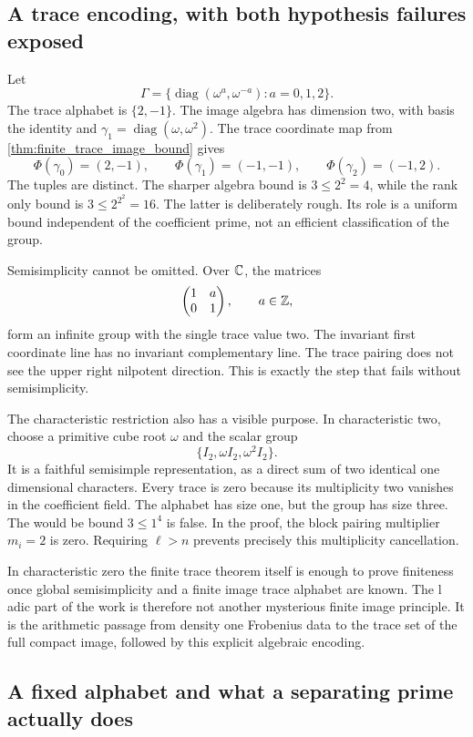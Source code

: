 \subsection{A trace encoding, with both hypothesis failures exposed}

Let
\[
 \Gamma=\{\operatorname{diag}(\omega^a,\omega^{-a}):a=0,1,2\}.
\]
The trace alphabet is \(\{2,-1\}\). The image algebra has dimension two, with basis the identity and \(\gamma_1=\operatorname{diag}(\omega,\omega^2)\). The trace coordinate map from \cref{thm:finite_trace_image_bound} gives
\[
 \Phi(\gamma_0)=(2,-1),\qquad
 \Phi(\gamma_1)=(-1,-1),\qquad
 \Phi(\gamma_2)=(-1,2).
\]
The tuples are distinct. The sharper algebra bound is \(3\le2^2=4\), while the rank only bound is \(3\le2^{2^2}=16\). The latter is deliberately rough. Its role is a uniform bound independent of the coefficient prime, not an efficient classification of the group.

Semisimplicity cannot be omitted. Over \(\mathbb C\), the matrices
\[
 \begin{pmatrix}1&a\\0&1\end{pmatrix},\qquad a\in\mathbb Z,
\]
form an infinite group with the single trace value two. The invariant first coordinate line has no invariant complementary line. The trace pairing does not see the upper right nilpotent direction. This is exactly the step that fails without semisimplicity.

The characteristic restriction also has a visible purpose. In characteristic two, choose a primitive cube root \(\omega\) and the scalar group
\[
 \{I_2,\omega I_2,\omega^2 I_2\}.
\]
It is a faithful semisimple representation, as a direct sum of two identical one dimensional characters. Every trace is zero because its multiplicity two vanishes in the coefficient field. The alphabet has size one, but the group has size three. The would be bound \(3\le1^{4}\) is false. In the proof, the block pairing multiplier \(m_i=2\) is zero. Requiring \(\ell>n\) prevents precisely this multiplicity cancellation.

In characteristic zero the finite trace theorem itself is enough to prove finiteness once global semisimplicity and a finite image trace alphabet are known. The l adic part of the work is therefore not another mysterious finite image principle. It is the arithmetic passage from density one Frobenius data to the trace set of the full compact image, followed by this explicit algebraic encoding.

\subsection{A fixed alphabet and what a separating prime actually does}

